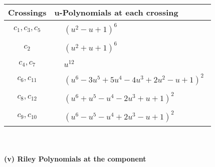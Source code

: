 \documentclass[1p]{elsarticle_modified}
\theoremstyle{definition}
\begin{document}
\begin{tabular}{m{50pt}|m{274pt}}
Crossings & \hspace{64pt}u-Polynomials at each crossing \\
\hline $$\begin{aligned}c_{1},c_{3},c_{5}\end{aligned}$$&$\begin{aligned}
&(u^2- u+1)^6
\end{aligned}$\\
\hline $$\begin{aligned}c_{2}\end{aligned}$$&$\begin{aligned}
&(u^2+u+1)^6
\end{aligned}$\\
\hline $$\begin{aligned}c_{4},c_{7}\end{aligned}$$&$\begin{aligned}
&u^{12}
\end{aligned}$\\
\hline $$\begin{aligned}c_{6},c_{11}\end{aligned}$$&$\begin{aligned}
&(u^6-3 u^5+5 u^4-4 u^3+2 u^2- u+1)^2
\end{aligned}$\\
\hline $$\begin{aligned}c_{8},c_{12}\end{aligned}$$&$\begin{aligned}
&(u^6+u^5- u^4-2 u^3+u+1)^2
\end{aligned}$\\
\hline $$\begin{aligned}c_{9},c_{10}\end{aligned}$$&$\begin{aligned}
&(u^6- u^5- u^4+2 u^3- u+1)^2
\end{aligned}$\\
\hline
\end{tabular}\\~\\
\newpage\renewcommand{\arraystretch}{1}
\flushleft \textbf{(v) Riley Polynomials at the component}\newline \\
\end{document}

